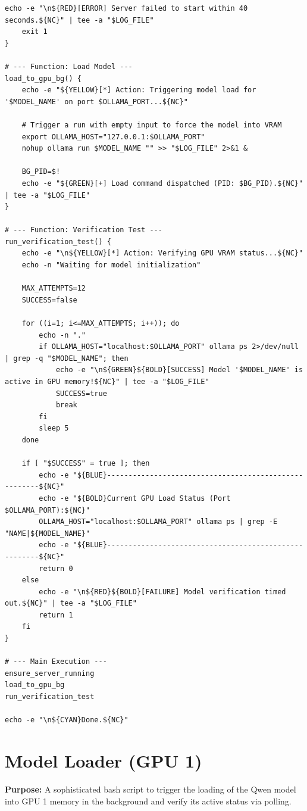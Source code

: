 \documentclass[11pt]{article}
\begin{document}
\begin{lstlisting}[style=bashcode, caption={load\_model\_gpu\_0.sh}]
    echo -e "\n${RED}[ERROR] Server failed to start within 40 seconds.${NC}" | tee -a "$LOG_FILE"
    exit 1
}

# --- Function: Load Model ---
load_to_gpu_bg() {
    echo -e "${YELLOW}[*] Action: Triggering model load for '$MODEL_NAME' on port $OLLAMA_PORT...${NC}"
    
    # Trigger a run with empty input to force the model into VRAM
    export OLLAMA_HOST="127.0.0.1:$OLLAMA_PORT"
    nohup ollama run $MODEL_NAME "" >> "$LOG_FILE" 2>&1 &
    
    BG_PID=$!
    echo -e "${GREEN}[+] Load command dispatched (PID: $BG_PID).${NC}" | tee -a "$LOG_FILE"
}

# --- Function: Verification Test ---
run_verification_test() {
    echo -e "\n${YELLOW}[*] Action: Verifying GPU VRAM status...${NC}"
    echo -n "Waiting for model initialization"
    
    MAX_ATTEMPTS=12
    SUCCESS=false
    
    for ((i=1; i<=MAX_ATTEMPTS; i++)); do
        echo -n "."
        if OLLAMA_HOST="localhost:$OLLAMA_PORT" ollama ps 2>/dev/null | grep -q "$MODEL_NAME"; then
            echo -e "\n${GREEN}${BOLD}[SUCCESS] Model '$MODEL_NAME' is active in GPU memory!${NC}" | tee -a "$LOG_FILE"
            SUCCESS=true
            break
        fi
        sleep 5
    done

    if [ "$SUCCESS" = true ]; then
        echo -e "${BLUE}------------------------------------------------------${NC}"
        echo -e "${BOLD}Current GPU Load Status (Port $OLLAMA_PORT):${NC}"
        OLLAMA_HOST="localhost:$OLLAMA_PORT" ollama ps | grep -E "NAME|${MODEL_NAME}"
        echo -e "${BLUE}------------------------------------------------------${NC}"
        return 0
    else
        echo -e "\n${RED}${BOLD}[FAILURE] Model verification timed out.${NC}" | tee -a "$LOG_FILE"
        return 1
    fi
}

# --- Main Execution ---
ensure_server_running
load_to_gpu_bg
run_verification_test

echo -e "\n${CYAN}Done.${NC}"
\end{lstlisting}

\section{Model Loader (GPU 1)} \label{sec:loader1}
\textbf{Purpose:} A sophisticated bash script to trigger the loading of the Qwen model into GPU 1 memory in the background and verify its active status via polling.
\end{document}
